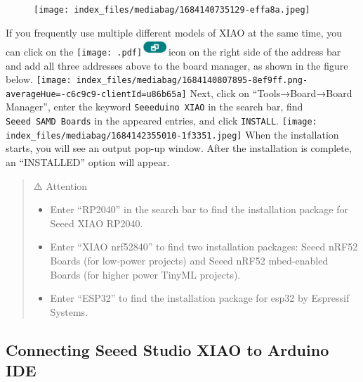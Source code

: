 \documentclass[
  letterpaper,
  DIV=11,
  numbers=noendperiod]{scrreprt}
\providecommand{\tightlist}{%
  \setlength{\itemsep}{0pt}\setlength{\parskip}{0pt}}\usepackage{longtable,booktabs,array}
\begin{document}
\begin{figure}[H]

{\centering \texttt{[image: index\_files/mediabag/1684140735129-effa8a.jpeg]}

}

\end{figure}

If you frequently use multiple different models of XIAO at the same
time, you can click on the
\texttt{[image: .pdf]}\includegraphics[width=10mm,height=6mm]{images/chapter_1/icon.jpg}icon
on the right side of the address bar and add all three addresses above
to the board manager, as shown in the figure below.
\texttt{[image: index\_files/mediabag/1684140807895-8ef9ff.png-averageHue=-c6c9c9-clientId=u86b65a]}
Next, click on ``Tools→Board→Board Manager'', enter the keyword
\texttt{Seeeduino\ XIAO} in the search bar, find
\texttt{Seeed\ SAMD\ Boards} in the appeared entries, and click
\texttt{INSTALL}.
\texttt{[image: index\_files/mediabag/1684142355010-1f3351.jpeg]} When
the installation starts, you will see an output pop-up window. After the
installation is complete, an ``INSTALLED'' option will appear.

\begin{quote}
⚠️ Attention

\begin{itemize}
\tightlist
\item
  Enter ``RP2040'' in the search bar to find the installation package
  for Seeed XIAO RP2040.
\item
  Enter ``XIAO nrf52840'' to find two installation packages: Seeed nRF52
  Boards (for low-power projects) and Seeed nRF52 mbed-enabled Boards
  (for higher power TinyML projects).
\item
  Enter ``ESP32'' to find the installation package for esp32 by
  Espressif Systems.
\end{itemize}
\end{quote}

\hypertarget{connecting-seeed-studio-xiao-to-arduino-ide}{%
\subsection*{Connecting Seeed Studio XIAO to Arduino
IDE}\label{connecting-seeed-studio-xiao-to-arduino-ide}}
\end{document}
